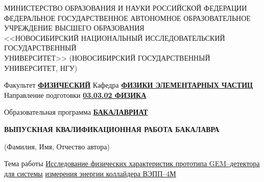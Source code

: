 \documentclass[a4paper,11pt]{extreport}
\begin{document}
	\thispagestyle{empty}
	
	\begin{center}
		МИНИСТЕРСТВО ОБРАЗОВАНИЯ И НАУКИ РОССИЙСКОЙ ФЕДЕРАЦИИ\\
		\vspace{0.3\baselineskip}
		 ФЕДЕРАЛЬНОЕ ГОСУДАРСТВЕННОЕ АВТОНОМНОЕ ОБРАЗОВАТЕЛЬНОЕ \\ 
			УЧРЕЖДЕНИЕ ВЫСШЕГО ОБРАЗОВАНИЯ \\
		\vspace{0.3\baselineskip}
		 <<НОВОСИБИРСКИЙ НАЦИОНАЛЬНЫЙ ИССЛЕДОВАТЕЛЬСКИЙ ГОСУДАРСТВЕННЫЙ \\
			УНИВЕРСИТЕТ>> (НОВОСИБИРСКИЙ ГОСУДАРСТВЕННЫЙ УНИВЕРСИТЕТ, НГУ)
	\end{center}
	\vspace{41pt}
	\noindent
	 Факультет \underline{\textbf{ФИЗИЧЕСКИЙ}}
	\vspace{11pt}
	\noindent
 	\newline Кафедра \underline{\textbf{ФИЗИКИ ЭЛЕМЕНТАРНЫХ ЧАСТИЦ}\hspace{8cm}}
	\vspace{21pt}
	\noindent
	\newline Направление подготовки \underline{\textbf{03.03.02 ФИЗИКА}}
	\vspace{11pt}
	
	\noindent
	Образовательная программа \underline{\textbf{БАКАЛАВРИАТ}}
	
	\vspace{21pt}
	\begin{center}\bfseries
		{ВЫПУСКНАЯ КВАЛИФИКАЦИОННАЯ РАБОТА БАКАЛАВРА} \\
	\end{center}
\vspace{0.3\baselineskip}

\noindent
{}
\noalign \hline
\vspace*{11pt}
\tiny{(Фамилия, Имя, Отчество автора)}

\vspace{\baselineskip}
\noindent \normalsize
\flushleft Тема работы \underline{Исследование физических характеристик прототипа GEM--детектора для системы\hspace{0.92cm}} \newline
\underline{ измерения энергии коллайдера ВЭПП--4М\hspace{9.5cm}}
\end{document}

